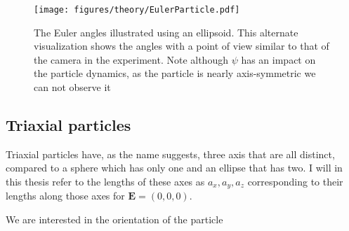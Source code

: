 \begin{figure}[H]
\begin{center}
\texttt{[image: figures/theory/EulerParticle.pdf]}
\end{center}
\caption{The Euler angles illustrated using an ellipsoid. This alternate visualization shows the angles with a point of view similar to that of the camera in the experiment. Note although $\psi$ has an impact on the particle dynamics, as the particle is nearly axis-symmetric we can not observe it}
\label{fig:eulerparticle}
\end{figure}


\subsection{Triaxial particles}
Triaxial particles have, as the name suggests, three axis that are all distinct, compared to a sphere which has only one and an ellipse that has two. I will in this thesis refer to the lengths of these axes as $a_x, a_y, a_z$ corresponding to their lengths along those axes for $\mathbf{E} = (0,0,0)$. 


We are interested in the orientation of the particle


